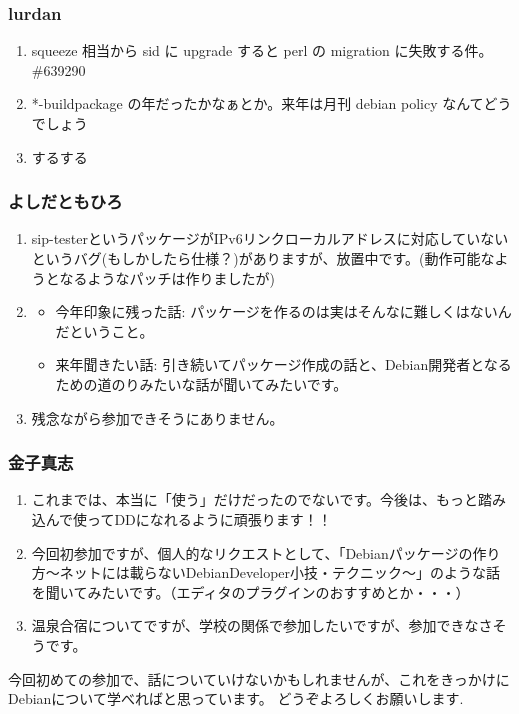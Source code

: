\documentclass[cjk,dvipdfmx,10pt,%
hyperref={bookmarks=true,bookmarksnumbered=true,bookmarksopen=false,%
colorlinks=false,%
pdftitle={第 54 回 関西 Debian 勉強会},%
pdfauthor={倉敷・のがた・佐々木},%
pdfsubject={資料},%
}]{beamer}
\begin{document}
\begin{frame}[fragile]
\frametitle{ lurdan }
  \begin{enumerate}
  \item squeeze 相当から sid に upgrade すると perl の migration に失敗する件。\#639290
  \item *-buildpackage の年だったかなぁとか。来年は月刊 debian policy なんてどうでしょう
  \item するする
  \end{enumerate}
\end{frame}

\begin{frame}[fragile]
\frametitle{ よしだともひろ }
  \begin{enumerate}
  \item sip-testerというパッケージがIPv6リンクローカルアドレスに対応していないというバグ(もしかしたら仕様？)がありますが、放置中です。(動作可能なようとなるようなパッチは作りましたが)
  \item
    \begin{itemize}
    \item 今年印象に残った話: パッケージを作るのは実はそんなに難しくはないんだということ。
    \item 来年聞きたい話: 引き続いてパッケージ作成の話と、Debian開発者となるための道のりみたいな話が聞いてみたいです。
    \end{itemize}
  \item 残念ながら参加できそうにありません。
  \end{enumerate}
\end{frame}

\begin{frame}[fragile]
\frametitle{ 金子真志 }
  \begin{enumerate}
  \item これまでは、本当に「使う」だけだったのでないです。今後は、もっと踏み込んで使ってDDになれるように頑張ります！！
  \item 今回初参加ですが、個人的なリクエストとして、「Debianパッケージの作り方〜ネットには載らないDebianDeveloper小技・テクニック〜」のような話を聞いてみたいです。（エディタのプラグインのおすすめとか・・・）
  \item 温泉合宿についてですが、学校の関係で参加したいですが、参加できなさそうです。
  \end{enumerate}
  今回初めての参加で、話についていけないかもしれませんが、これをきっかけにDebianについて学べればと思っています。
  どうぞよろしくお願いします.
\end{frame}
\end{document}
